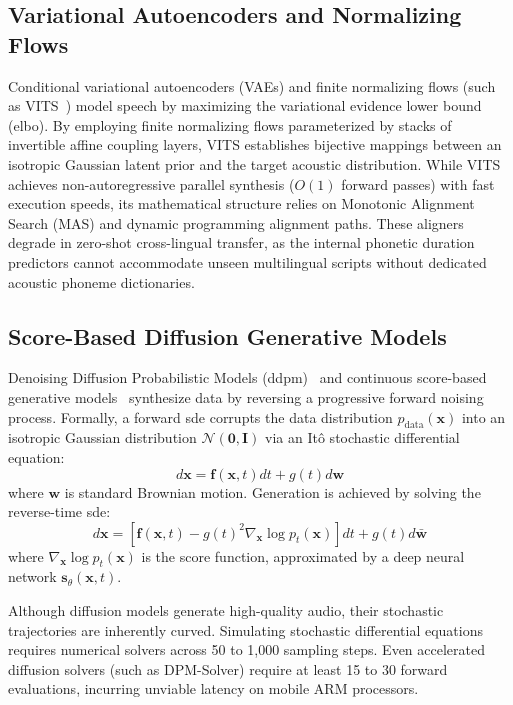 \subsection{Variational Autoencoders and Normalizing Flows}
Conditional variational autoencoders (VAEs) and finite normalizing flows (such as VITS~\cite{kim2021vits}) model speech by maximizing the variational evidence lower bound (\acrshort{elbo}). By employing finite normalizing flows parameterized by stacks of invertible affine coupling layers, VITS establishes bijective mappings between an isotropic Gaussian latent prior and the target acoustic distribution. While VITS achieves non-autoregressive parallel synthesis ($O(1)$ forward passes) with fast execution speeds, its mathematical structure relies on Monotonic Alignment Search (MAS) and dynamic programming alignment paths. These aligners degrade in zero-shot cross-lingual transfer, as the internal phonetic duration predictors cannot accommodate unseen multilingual scripts without dedicated acoustic phoneme dictionaries.

\subsection{Score-Based Diffusion Generative Models}
Denoising Diffusion Probabilistic Models (\acrshort{ddpm})~\cite{ho2020ddpm} and continuous score-based generative models~\cite{song2020score} synthesize data by reversing a progressive forward noising process. Formally, a forward \gls{sde} corrupts the data distribution $p_{\text{data}}(\mathbf{x})$ into an isotropic Gaussian distribution $\mathcal{N}(\mathbf{0}, \mathbf{I})$ via an It\^o stochastic differential equation:
\begin{equation}
    d\mathbf{x} = \mathbf{f}(\mathbf{x}, t)dt + g(t)d\mathbf{w}
    \label{eq:forward_sde}
\end{equation}
where $\mathbf{w}$ is standard Brownian motion. Generation is achieved by solving the reverse-time \gls{sde}:
\begin{equation}
    d\mathbf{x} = \left[ \mathbf{f}(\mathbf{x}, t) - g(t)^2 \nabla_{\mathbf{x}} \log p_t(\mathbf{x}) \right] dt + g(t)d\bar{\mathbf{w}}
    \label{eq:reverse_sde}
\end{equation}
where $\nabla_{\mathbf{x}} \log p_t(\mathbf{x})$ is the score function, approximated by a deep neural network $\mathbf{s}_\theta(\mathbf{x}, t)$. 

Although diffusion models generate high-quality audio, their stochastic trajectories are inherently curved. Simulating stochastic differential equations requires numerical solvers across 50 to 1,000 sampling steps. Even accelerated diffusion solvers (such as DPM-Solver) require at least 15 to 30 forward evaluations, incurring unviable latency on mobile ARM processors.

